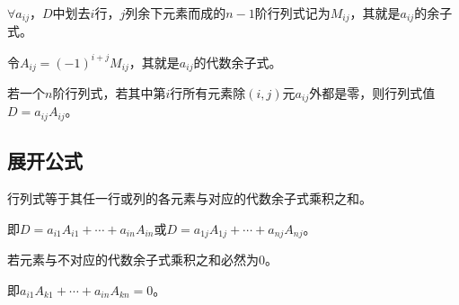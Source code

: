 \documentclass[UTF8, 12pt]{ctexart}
\begin{document}
$\forall a_{ij}$，$D$中划去$i$行，$j$列余下元素而成的$n-1$阶行列式记为$M_{ij}$，其就是$a_{ij}$的余子式。

令$A_{ij}=(-1)^{i+j}M_{ij}$，其就是$a_{ij}$的代数余子式。

若一个$n$阶行列式，若其中第$i$行所有元素除$(i,j)$元$a_{ij}$外都是零，则行列式值$D=a_{ij}A_{ij}$。

\subsection{展开公式}

行列式等于其任一行或列的各元素与对应的代数余子式乘积之和。

即$D=a_{i1}A_{i1}+\cdots+a_{in}A_{in}$或$D=a_{1j}A_{1j}+\cdots+a_{nj}A_{nj}$。

若元素与不对应的代数余子式乘积之和必然为0。

即$a_{i1}A_{k1}+\cdots+a_{in}A_{kn}=0$。
\end{document}
